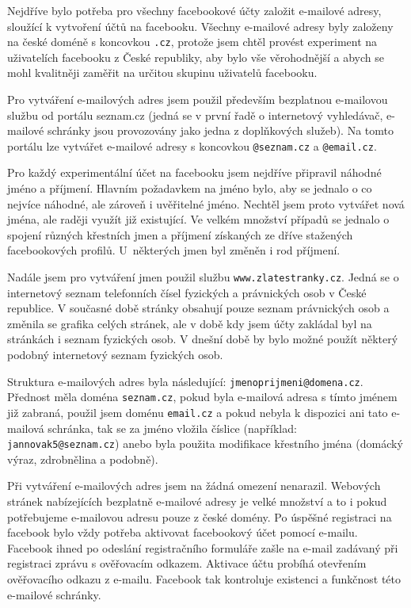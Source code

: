 \documentclass[thesis=M,czech]{FITthesis}[2013/05/10]
\begin{document}
Nejdříve bylo potřeba pro všechny facebookové účty založit e-mailové adresy, sloužící k vytvoření účtů na facebooku. Všechny e-mailové adresy byly založeny na české doméně s koncovkou \verb|.cz|, protože jsem chtěl provést experiment na uživatelích facebooku z České republiky, aby bylo vše věrohodnější a abych se mohl kvalitněji zaměřit na určitou skupinu uživatelů facebooku. 

Pro vytváření e-mailových adres jsem použil především bezplatnou e-mailovou službu od portálu seznam.cz (jedná se v první řadě o internetový vyhledávač, e-mailové schránky jsou provozovány jako jedna z doplňkových služeb). Na tomto portálu lze vytvářet e-mailové adresy s koncovkou \verb|@seznam.cz| a \verb|@email.cz|.

Pro každý experimentální účet na facebooku jsem nejdříve připravil náhodné jméno a příjmení. Hlavním požadavkem na jméno bylo, aby se jednalo o co nejvíce náhodné, ale zároveň i uvěřitelné jméno. Nechtěl jsem proto vytvářet nová jména, ale raději využít již existující. Ve velkém množství případů se jednalo o spojení různých křestních jmen a příjmení získaných ze dříve stažených facebookových profilů. U~některých jmen byl změněn i rod příjmení. 

Nadále jsem pro vytváření jmen použil službu \verb|www.zlatestranky.cz|. Jedná se o internetový seznam telefonních čísel fyzických a právnických osob v České republice. V současné době stránky obsahují pouze seznam právnických osob a změnila se grafika celých stránek, ale v době kdy jsem účty zakládal byl na stránkách i seznam fyzických osob. V dnešní době by bylo možné použít některý podobný internetový seznam fyzických osob.

Struktura e-mailových adres byla následující: \verb|jmenoprijmeni@domena.cz|. Přednost měla doména \verb|seznam.cz|, pokud byla e-mailová adresa s tímto jménem již zabraná, použil jsem doménu \verb|email.cz| a pokud nebyla k dispozici ani tato e-mailová schránka, tak se za jméno vložila číslice (například: \verb|jannovak5@seznam.cz|) anebo byla použita modifikace křestního jména (domácký výraz, zdrobnělina a podobně).

Při vytváření e-mailových adres jsem na žádná omezení nenarazil. Webových stránek nabízejících bezplatně e-mailové adresy je velké množství a to i pokud potřebujeme e-mailovou adresu pouze z české domény. Po úspěšné registraci na facebook bylo vždy potřeba aktivovat facebookový účet pomocí e-mailu. Facebook ihned po odeslání registračního formuláře zašle na e-mail zadávaný při registraci zprávu s ověřovacím odkazem. Aktivace účtu probíhá otevřením ověřovacího odkazu z e-mailu. Facebook tak kontroluje existenci a funkčnost této e-mailové schránky.
\end{document}
